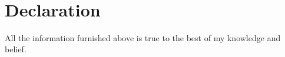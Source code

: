 \documentclass[11pt,a4paper,sans]{moderncv}        %
\begin{document}
~\\

\section{Declaration}
All the information furnished above is true to the best of my knowledge and belief.

~\\

\begin{flushleft}
{\color{bluecolor}{\large Place : Pune}} ~\ ~\ ~\ ~\ ~\ ~\ ~\ ~\ ~\ ~\ ~\ ~\ ~\ ~\ ~\ ~\ ~\ ~\ ~\ ~\ ~\ ~\ ~\ ~\ ~\ ~\ ~\ ~\ ~\ ~\  {\color{bluecolor}{\large Bollapragada Naga Ratna Kumar}}
\end{flushleft}



\end{document}
